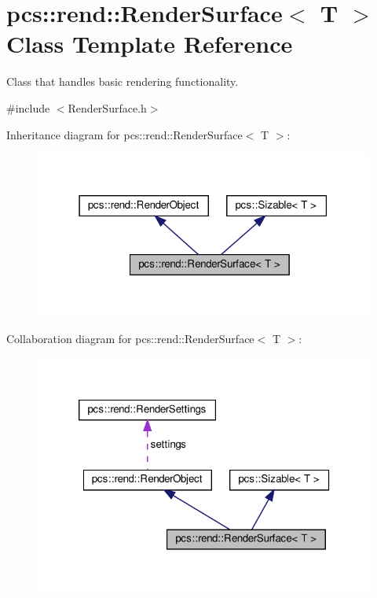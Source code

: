 \hypertarget{classpcs_1_1rend_1_1RenderSurface}{}\section{pcs\+:\+:rend\+:\+:Render\+Surface$<$ T $>$ Class Template Reference}
\label{classpcs_1_1rend_1_1RenderSurface}


Class that handles basic rendering functionality.  




{\ttfamily \#include $<$Render\+Surface.\+h$>$}



Inheritance diagram for pcs\+:\+:rend\+:\+:Render\+Surface$<$ T $>$\+:
\nopagebreak
\begin{figure}[H]
\begin{center}
\leavevmode
\includegraphics[width=316pt]{classpcs_1_1rend_1_1RenderSurface__inherit__graph}
\end{center}
\end{figure}


Collaboration diagram for pcs\+:\+:rend\+:\+:Render\+Surface$<$ T $>$\+:
\nopagebreak
\begin{figure}[H]
\begin{center}
\leavevmode
\includegraphics[width=320pt]{classpcs_1_1rend_1_1RenderSurface__coll__graph}
\end{center}
\end{figure}
